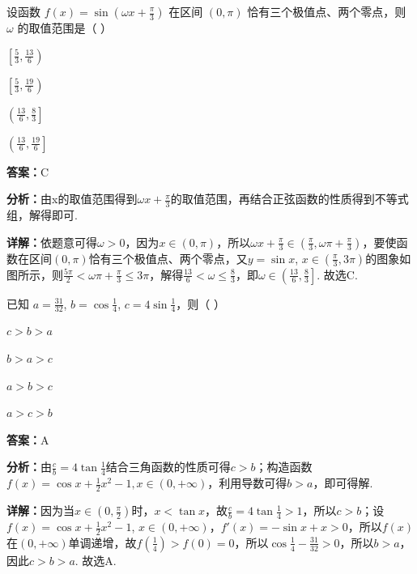 \begin{question}[points=5]
设函数 $f(x)=\sin\left(\omega x+\frac{\pi}{3}\right)$ 在区间 $(0,\pi)$ 恰有三个极值点、两个零点，则 $\omega$ 的取值范围是（ ）
\begin{choices}
  \item $\left[\frac{5}{3},\frac{13}{6}\right)$
  \item $\left[\frac{5}{3},\frac{19}{6}\right)$
  \item $\left(\frac{13}{6},\frac{8}{3}\right]$
  \item $\left(\frac{13}{6},\frac{19}{6}\right]$
\end{choices}
\begin{solution}
\textbf{答案：}C

\textbf{分析：}由x的取值范围得到$\omega x+\frac{\pi}{3}$的取值范围，再结合正弦函数的性质得到不等式组，解得即可.

\textbf{详解：}依题意可得$\omega>0$，因为$x\in(0,\pi)$，所以$\omega x+\frac{\pi}{3}\in\left(\frac{\pi}{3},\omega\pi+\frac{\pi}{3}\right)$，要使函数在区间$(0,\pi)$恰有三个极值点、两个零点，又$y=\sin x$, $x\in\left(\frac{\pi}{3},3\pi\right)$的图象如图所示，则$\frac{5\pi}{2}<\omega\pi+\frac{\pi}{3}\leq 3\pi$，解得$\frac{13}{6}<\omega\leq\frac{8}{3}$，即$\omega\in\left(\frac{13}{6},\frac{8}{3}\right]$. 故选C.
\end{solution}
\end{question}

\begin{question}[points=5]
已知 $a=\frac{31}{32}$, $b=\cos\frac{1}{4}$, $c=4\sin\frac{1}{4}$，则（ ）
\begin{choices}
  \item $c>b>a$
  \item $b>a>c$
  \item $a>b>c$
  \item $a>c>b$
\end{choices}
\begin{solution}
\textbf{答案：}A

\textbf{分析：}由$\frac{c}{b}=4\tan\frac{1}{4}$结合三角函数的性质可得$c>b$；构造函数$f(x)=\cos x+\frac{1}{2}x^2-1, x\in(0,+\infty)$，利用导数可得$b>a$，即可得解.

\textbf{详解：}因为当$x\in(0,\frac{\pi}{2})$时，$x<\tan x$，故$\frac{c}{b}=4\tan\frac{1}{4}>1$，所以$c>b$；设$f(x)=\cos x+\frac{1}{2}x^2-1$, $x\in(0,+\infty)$，$f'(x)=-\sin x+x>0$，所以$f(x)$在$(0,+\infty)$单调递增，故$f(\frac{1}{4})>f(0)=0$，所以$\cos\frac{1}{4}-\frac{31}{32}>0$，所以$b>a$，因此$c>b>a$. 故选A.
\end{solution}
\end{question}

